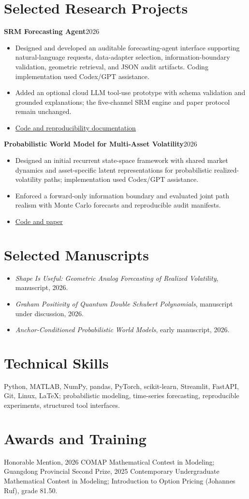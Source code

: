 \documentclass[9pt]{article}
\newcommand{\entry}[2]{\textbf{#1}\hfill #2\\}
\begin{document}
\section*{Selected Research Projects}
\entry{SRM Forecasting Agent}{2026}
\begin{itemize}
\item Designed and developed an auditable forecasting-agent interface supporting natural-language requests, data-adapter selection, information-boundary validation, geometric retrieval, and JSON audit artifacts. Coding implementation used Codex/GPT assistance.
\item Added an optional cloud LLM tool-use prototype with schema validation and grounded explanations; the five-channel SRM engine and paper protocol remain unchanged.
\item \href{https://github.com/xtr1976536/srm-forecasting-agent}{Code and reproducibility documentation}
\end{itemize}
\entry{Probabilistic World Model for Multi-Asset Volatility}{2026}
\begin{itemize}
\item Designed an initial recurrent state-space framework with shared market dynamics and asset-specific latent representations for probabilistic realized-volatility paths; implementation used Codex/GPT assistance.
\item Enforced a forward-only information boundary and evaluated joint path realism with Monte Carlo forecasts and reproducible audit manifests.
\item \href{https://github.com/xtr1976536/volatility-world-model}{Code and paper}
\end{itemize}
\section*{Selected Manuscripts}
\begin{itemize}
\item \textit{Shape Is Useful: Geometric Analog Forecasting of Realized Volatility}, manuscript, 2026.
\item \textit{Graham Positivity of Quantum Double Schubert Polynomials}, manuscript under discussion, 2026.
\item \textit{Anchor-Conditioned Probabilistic World Models}, early manuscript, 2026.
\end{itemize}
\section*{Technical Skills}
Python, MATLAB, NumPy, pandas, PyTorch, scikit-learn, Streamlit, FastAPI, Git, Linux, LaTeX; probabilistic modeling, time-series forecasting, reproducible experiments, structured tool interfaces.
\section*{Awards and Training}
Honorable Mention, 2026 COMAP Mathematical Contest in Modeling; Guangdong Provincial Second Prize, 2025 Contemporary Undergraduate Mathematical Contest in Modeling; Introduction to Option Pricing (Johannes Ruf), grade 81.50.
\end{document}
